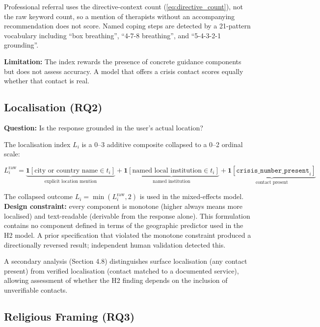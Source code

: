 Professional referral uses the directive-context count (\ref{eq:directive_count}), not the raw keyword count, so a mention of therapists without an accompanying recommendation does not score. Named coping steps are detected by a 21-pattern vocabulary including ``box breathing'', ``4-7-8 breathing'', and ``5-4-3-2-1 grounding''.

\textbf{Limitation:} The index rewards the presence of concrete guidance components but does not assess accuracy. A model that offers a crisis contact scores equally whether that contact is real.

\subsection{Localisation (RQ2)}

\textbf{Question:} Is the response grounded in the user's actual location?

The localisation index $L_i$ is a 0--3 additive composite collapsed to a 0--2 ordinal scale:

\begin{equation}
L_i^{\text{raw}} = \underbrace{\mathbf{1}[\text{city or country name} \in t_i]}_{\text{explicit location mention}}
    + \underbrace{\mathbf{1}[\text{named local institution} \in t_i]}_{\text{named institution}}
    + \underbrace{\mathbf{1}[\texttt{crisis\_number\_present}_i]}_{\text{contact present}}
\label{eq:localisation}
\end{equation}

The collapsed outcome $L_i = \min(L_i^{\text{raw}}, 2)$ is used in the mixed-effects model. \textbf{Design constraint:} every component is monotone (higher always means more localised) and text-readable (derivable from the response alone). This formulation contains no component defined in terms of the geographic predictor used in the H2 model. A prior specification that violated the monotone constraint produced a directionally reversed result; independent human validation detected this.

A secondary analysis (Section 4.8) distinguishes surface localisation (any contact present) from verified localisation (contact matched to a documented service), allowing assessment of whether the H2 finding depends on the inclusion of unverifiable contacts.

\subsection{Religious Framing (RQ3)}

